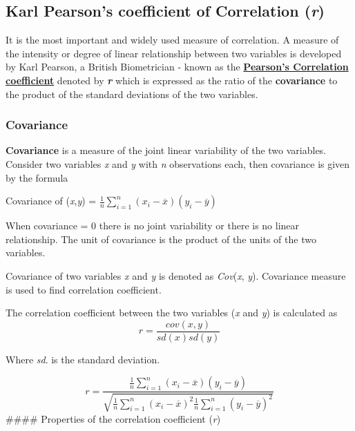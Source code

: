\documentclass[
]{book}
\begin{document}
\hypertarget{karl-pearsons-coefficient-of-correlation-r}{%
\subsection{\texorpdfstring{Karl Pearson's coefficient of Correlation (\emph{r})}{Karl Pearson's coefficient of Correlation (r)}}\label{karl-pearsons-coefficient-of-correlation-r}}

It is the most important and widely used measure of correlation. A
measure of the intensity or degree of linear relationship between two
variables is developed by Karl Pearson, a British Biometrician - known
as the \textbf{\underline{Pearson's Correlation coefficient}} denoted by \textbf{\emph{r}}
which is expressed as the ratio of the \textbf{covariance} to the product of the standard deviations of the two variables.

\hypertarget{covariance}{%
\subsubsection{Covariance}\label{covariance}}

\textbf{Covariance} is a measure of the joint linear variability of the two
variables. Consider two variables \emph{x} and \emph{y} with \emph{n} observations
each, then covariance is given by the formula

Covariance of (\emph{x},\emph{y}) =
\(\frac{1}{n}\sum_{i = 1}^{n}{\left( x_{i} - \overline{x} \right)\left( y_{i} - \overline{y} \right)}\)

When covariance = 0 there is no joint variability or there is no linear
relationship. The unit of covariance is the product of the units of the
two variables.

Covariance of two variables \emph{x} and \emph{y} is denoted as \emph{Cov}(\emph{x}, \emph{y}).
Covariance measure is used to find correlation coefficient.

The correlation coefficient between the two variables (\emph{x} and \emph{y}) is
calculated as\\
\[r=\frac{cov(x,y)}{sd(x)sd(y)}\]

Where \emph{sd}. is the standard deviation.

\[r = \frac{\frac{1}{n}\sum_{i = 1}^{n}{\left( x_{i} - \overline{x} \right)\left( y_{i} - \overline{y} \right)}}{\sqrt{\frac{1}{n}\sum_{i = 1}^{n}\left( x_{i} - \overline{x} \right)^{2}\frac{1}{n}\sum_{i = 1}^{n}\left( y_{i} - \overline{y} \right)^{2}}}\]
\#\#\#\# Properties of the correlation coefficient (\emph{r})
\end{document}
